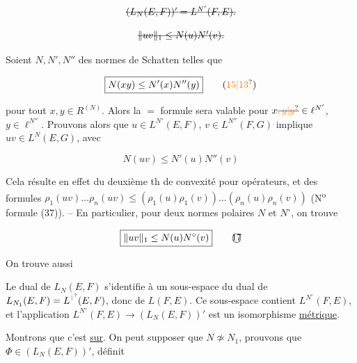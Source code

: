 
\[
\deleted{(L_N(E,F))'=L^{N'}(F,E).}
\]


\[
\deleted{\lVert uv\rVert_1\leq N(u)N'(v).}
\]

 Soient $N,N',N''$ des normes de Schatten telles que

\[
\boxed{N(xy)\leq N'(x)N''(y)}\tag*{(\unsure{15|13})}
\]

pour tout $x,y\in R^{(N)}$. Alors la $=$ formule sera valable pour $x\deleted{\unsure{,y|y}}\in\ell^{N'}$, $y\in\ell^{N''}$. Prouvons alors que $u\in L^{N'}(E,F)$, $v\in L^{N''}(F,G)$ implique $uv\in L^N(E,G)$, avec

\[
\boxed{N(uv)\leq N'(u)N''(v)}\tag*{(16)}
\]

Cela résulte en effet  du deuxième th de convexité pour opérateurs, et des formules $\rho_1(uv)\ldots\rho_n(uv)\leq(\rho_1(u)\rho_1(v))\ldots(\rho_n(u)\rho_n(v))$ (N\textsuperscript{o} \unsure{,} formule (37)). -- En particulier,  pour  deux normes polaires $N$ et $N^\circ$, on trouve


\[
\boxed{\lVert uv\rVert_1\leq N(u)N^\circ(v)}\tag*{\textcircled{17}}
\]

On trouve aussi  

Le dual de $L_N(E,F)$ s'identifie à un sous-espace du dual de $L_{N_1}(E,F)=L^{\unsure{1}}(E,F)$, donc de $L(F,E)$. Ce sous-espace contient $L^{N^\circ}(F,E)$, et l'application $L^{N^\circ}(F,E)\to(L_N(E,F))'$ est un isomorphisme \uline{métrique}.

Montrons que c'est \uline{sur}. On peut supposer que $N\not\simeq N_1$, prouvons que   $\Phi\in(L_N(E,F))'$, définit  

